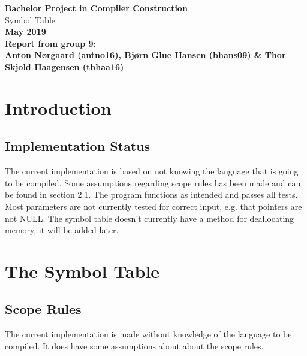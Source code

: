 \documentclass{article}
\newcommand{\bigfont}{\usefont{OT1}{cmbig}{m}{n}}
\newcommand{\MyHuge}[1]{{\bigfont\fontsize{2.2cm}{2.42cm}\selectfont #1}}
\begin{document}
\thispagestyle{empty}

\begin{center}
{\LARGE\bf Bachelor Project in Compiler Construction}
\\[15ex]
\MyHuge{Symbol Table}
\\[15ex]
{\LARGE\bf May 2019}
\\[10ex]
{\Large\bf Report from group 9:}
\\[2ex]
{\Large\bf Anton Nørgaard (antno16), Bjørn Glue Hansen (bhans09) \& Thor Skjold Haagensen (thhaa16)}
\end{center}

\setcounter{page}{0}

\newpage

\section{Introduction}




\subsection{Implementation Status}
The current implementation is based on not knowing the language that is going to be compiled. Some assumptions regarding scope rules has been made and can be found in section 2.1. The program functions as intended and passes all tests. Most parameters are not currently tested for correct input, e.g. that pointers are not NULL. The symbol table doesn't currently have a method for deallocating memory, it will be added later.

\section{The Symbol Table}

\subsection{Scope Rules}
The current implementation is made without knowledge of the language to be compiled. It does have some assumptions about about the scope rules.
\end{document}
